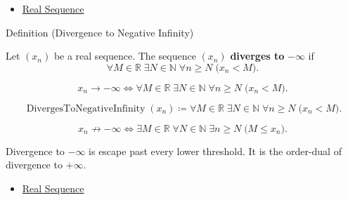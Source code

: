 \begin{dependencies}
\begin{itemize}
  \item \hyperref[def:real-sequence]{Real Sequence}
\end{itemize}
\end{dependencies}


\begin{definitionbox}{Definition (Divergence to Negative Infinity)}
\begin{definition}
\label{def:diverges-to-negative-infinity}
Let $(x_n)$ be a real sequence. The sequence $(x_n)$ \textbf{diverges to}
$-\infty$ if
\[
  \forall M\in\mathbb{R}\;\exists N\in\mathbb{N}\;\forall n\ge N
  \;\bigl(x_n<M\bigr).
\]
\end{definition}
\end{definitionbox}

\begin{remark*}
\[
x_n\to-\infty
\Longleftrightarrow
\forall M\in\mathbb{R}\;\exists N\in\mathbb{N}\;\forall n\ge N
\;\bigl(x_n<M\bigr).
\]
\end{remark*}

\begin{remark*}
\[
\operatorname{DivergesToNegativeInfinity}(x_n)
\coloneqq
\forall M\in\mathbb{R}\;\exists N\in\mathbb{N}\;\forall n\ge N
\;\bigl(x_n<M\bigr).
\]
\end{remark*}

\begin{remark*}
\[
x_n\not\to-\infty
\Longleftrightarrow
\exists M\in\mathbb{R}\;\forall N\in\mathbb{N}\;\exists n\ge N
\;\bigl(M\le x_n\bigr).
\]
\end{remark*}

\begin{remark*}[Interpretation]
Divergence to $-\infty$ is escape past every lower threshold. It is the
order-dual of divergence to $+\infty$.
\end{remark*}

\begin{dependencies}
\begin{itemize}
  \item \hyperref[def:real-sequence]{Real Sequence}
\end{itemize}
\end{dependencies}

